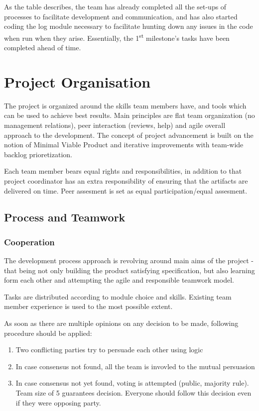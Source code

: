 As the table describes, the team has already completed all the set-ups of processes to facilitate development and communication, and has also started coding the log module necessary to facilitate hunting down any issues in the code when run when they arise. Essentially, the 1\textsuperscript{st} milestone's tasks have been completed ahead of time.

\section{Project Organisation} %
The project is organized around the skills team members have, and tools which can be used to achieve best results. Main
principles are flat team organization (no management relations), peer interaction (reviews, help) and agile overall
approach to the development. The concept of project advancement is built on the notion of Minimal Viable Product and
iterative improvements with team-wide backlog prioretization.

Each team member bears equal rights and responsibilities, in addition to that project coordinator has an extra responsibility
of ensuring that the artifacts are delivered on time. Peer assesment is set as equal participation/equal assesment.

\subsection{Process and Teamwork}
\subsubsection{Cooperation}
The development process approach is revolving around main aims of the project - that being not only building the product
satisfying specification, but also learning form each other and attempting the agile and responsible teamwork model.

Tasks are distributed according to module choice and skills. Existing team member experience is used to the most
possible extent.

As soon as there are multiple opinions on any decision to be made, following procedure should be applied:

\begin{enumerate}
    \item Two conflicting parties try to persuade each other using logic
    \item In case consensus not found, all the team is invovled to the mutual persuasion
    \item In case consensus not yet found, voting is attempted (public, majority rule). Team size of 5 guarantees decision.
        Everyone should follow this decision even if they were opposing party.
\end{enumerate}

